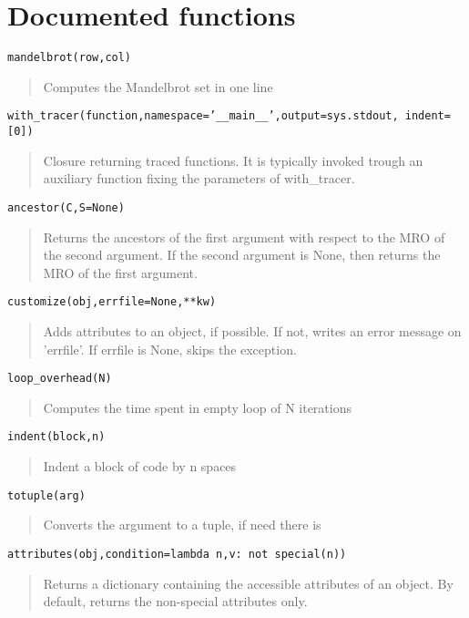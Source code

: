 \documentclass[10pt,english]{article}
\begin{document}
\hypertarget{documented-functions}{}
\section*{Documented functions}

\texttt{mandelbrot(row,col)}
\begin{quote}

Computes the Mandelbrot set in one line
\end{quote}

\texttt{with{\_}tracer(function,namespace='{\_}{\_}main{\_}{\_}',output=sys.stdout, indent=[0])}
\begin{quote}

Closure returning traced functions. It is typically invoked
trough an auxiliary function fixing the parameters of with{\_}tracer.
\end{quote}

\texttt{ancestor(C,S=None)}
\begin{quote}

Returns the ancestors of the first argument with respect to the 
MRO of the second argument. If the second argument is None, then 
returns the MRO of the first argument.
\end{quote}

\texttt{customize(obj,errfile=None,**kw)}
\begin{quote}

Adds attributes to an object, if possible. If not, writes an error
message on 'errfile'. If errfile is None, skips the exception.
\end{quote}

\texttt{loop{\_}overhead(N)}
\begin{quote}

Computes the time spent in empty loop of N iterations
\end{quote}

\texttt{indent(block,n)}
\begin{quote}

Indent a block of code by n spaces
\end{quote}

\texttt{totuple(arg)}
\begin{quote}

Converts the argument to a tuple, if need there is
\end{quote}

\texttt{attributes(obj,condition=lambda n,v: not special(n))}
\begin{quote}

Returns a dictionary containing the accessible attributes of 
an object. By default, returns the non-special attributes only.
\end{quote}
\end{document}
